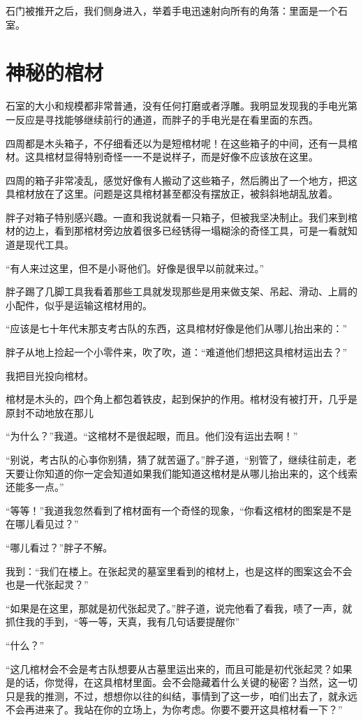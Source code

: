 石门被推开之后，我们侧身进入，举着手电迅速射向所有的角落：里面是一个石室。

\chapter{神秘的棺材}

石室的大小和规模都非常普通，没有任何打磨或者浮雕。我明显发现我的手电光第一反应是寻找能够继续前行的通道，而胖子的手电光是在看里面的东西。

四周都是木头箱子，不仔细看还以为是短棺材呢！在这些箱子的中间，还有一具棺材。这具棺材显得特别奇怪一一不是说样子，而是好像不应该放在这里。

四周的箱子非常凌乱，感觉好像有人搬动了这些箱子，然后腾出了一个地方，把这具棺材放在了这里。问题是这具棺材甚至都没有摆放正，被斜斜地胡乱放着。

胖子对箱子特别感兴趣。一直和我说就看一只箱子，但被我坚决制止。我们来到棺材的边上，看到那棺材旁边放着很多已经锈得一塌糊涂的奇怪工具，可是一看就知道是现代工具。

“有人来过这里，但不是小哥他们。好像是很早以前就来过。”

胖子踢了几脚工具我看着那些工具就发现那些是用来做支架、吊起、滑动、上肩的小配件，似乎是运输这棺材用的。

“应该是七十年代末那支考古队的东西，这具棺材好像是他们从哪儿抬出来的：”

胖子从地上捡起一个小零件来，吹了吹，道：“难道他们想把这具棺材运出去？”

我把目光投向棺材。

棺材是木头的，四个角上都包着铁皮，起到保护的作用。棺材没有被打开，几乎是原封不动地放在那儿

“为什么？”我道。“这棺材不是很起眼，而且。他们没有运出去啊！”

“别说，考古队的心亊你别猜，猜了就苦逼了。”胖子道，“别管了，继续往前走，老天要让你知道的你一定会知道如果我们能知道这棺材是从哪儿抬出来的，这个线索还能多一点。”

“等等！”我道我忽然看到了棺材面有一个奇怪的现象，“你看这棺材的图案是不是在哪儿看见过？”

“哪儿看过？”胖子不解。

我到：“我们在楼上。在张起灵的墓室里看到的棺材上，也是这样的图案这会不会也是一代张起灵？”

“如果是在这里，那就是初代张起灵了。”胖子道，说完他看了看我，啧了一声，就抓住我的手到，“等一等，天真，我有几句话要提醒你”

“什么？”

“这几棺材会不会是考古队想要从古墓里运出来的，而且可能是初代张起灵？如果是的话，你觉得，在这具棺材里面。会不会隐藏着什么关键的秘密？当然，这一切只是我的推测，不过，想想你以往的纠结，事情到了这一步，咱们出去了，就永远不会再进来了。我站在你的立场上，为你考虑。你要不要开这具棺材看一下？”

